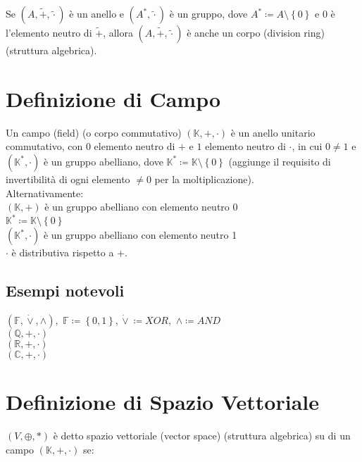 \documentclass[a4paper, twoside, italian, 11pt]{book}
\newcommand{\braces}[1] {\left \{ #1 \right \}}
\newcommand{\Q}{\mathbb Q}
\newcommand{\R}{\mathbb R}
\newcommand{\C}{\mathbb C}
\newcommand{\K}{\mathbb K}
\newcommand{\F}{\mathbb F}
\begin{document}
Se $(A, \tilde{+}, \tilde{\cdot})$ è un anello e $(A^*, \tilde{\cdot})$ è un gruppo, dove $A^* \coloneqq A \setminus \braces{0}$ e $0$ è l'elemento neutro di $\tilde{+}$, allora $(A, \tilde{+}, \tilde{\cdot})$ è anche un corpo (division ring) (struttura algebrica). \\



\section{Definizione di Campo}

Un campo (field) (o corpo commutativo) $(\K, +, \cdot)$ è un anello unitario commutativo, con $0$ elemento neutro di $+$ e $1$ elemento neutro di $\cdot$, in cui $0 \neq 1$ e $(\K^*, \cdot)$ è un gruppo abelliano, dove $\K^* \coloneqq \K \setminus \braces{0}$ (aggiunge il requisito di invertibilità di ogni elemento $\neq 0$ per la moltiplicazione). \\

\noindent
Alternativamente: \\

$(\K, +)$ è un gruppo abelliano con elemento neutro 0 \\
\indent
$\K^* \coloneqq \K \setminus \braces{0}$ \\
\indent
$(\K^*, \cdot)$ è un gruppo abelliano con elemento neutro 1 \\
\indent
$\cdot$ è distributiva rispetto a $+$.


\subsection{Esempi notevoli}

$(\F, \dot\lor, \land),$ $\F \coloneqq \braces{0, 1}, \dot\lor \coloneqq XOR,$ $\land \coloneqq AND$ \\
$(\Q, +, \cdot)$ \\
$(\R, +, \cdot)$ \\
$(\C, +, \cdot)$





\section{Definizione di Spazio Vettoriale}

$(V, \oplus, *)$ è detto spazio vettoriale (vector space) (struttura algebrica) su di un campo $(\K, +, \cdot)$ se: \\
\end{document}
